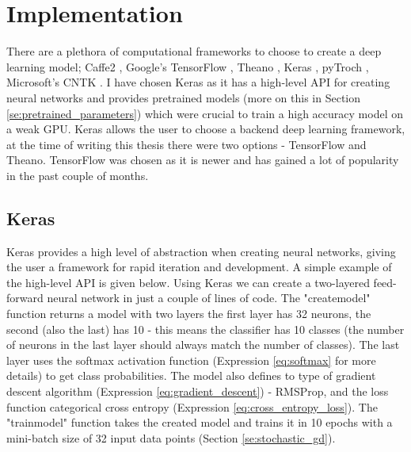 \documentclass[times, utf8, diplomski]{fer}
\begin{document}
\section{Implementation}

There are a plethora of computational frameworks to choose to create a deep learning model; Caffe2 \citep{caffe}, Google's TensorFlow \citep{tensorflow}, Theano \citep{theano}, Keras \citep{keras}, pyTroch \citep{pytorch}, Microsoft's CNTK \citep{cntk}. I have chosen Keras as it has a high-level API for creating neural networks and provides pretrained models (more on this in Section \ref{se:pretrained_parameters}) which were crucial to train a high accuracy model on a weak GPU. Keras allows the user to choose a backend deep learning framework, at the time of writing this thesis there were two options - TensorFlow and Theano. TensorFlow was chosen as it is newer and has gained a lot of popularity in the past couple of months.

\subsection{Keras}
\label{se:keras}

Keras provides a high level of abstraction when creating neural networks, giving the user a framework for rapid iteration and development. A simple example of the high-level API is given below. Using Keras we can create a two-layered feed-forward neural network in just a couple of lines of code. The "create\textunderscore model" function returns a model with two layers the first layer has 32 neurons, the second (also the last) has 10 - this means the classifier has 10 classes (the number of neurons in the last layer should always match the number of classes). The last layer uses the softmax activation function (Expression \ref{eq:softmax} for more details) to get class probabilities. The model also defines to type of gradient descent algorithm (Expression \ref{eq:gradient_descent}) - RMSProp, and the loss function categorical cross entropy (Expression \ref{eq:cross_entropy_loss}). The "train\textunderscore model" function takes the created model and trains it in 10 epochs with a mini-batch size of 32 input data points (Section \ref{se:stochastic_gd}).
\end{document}
